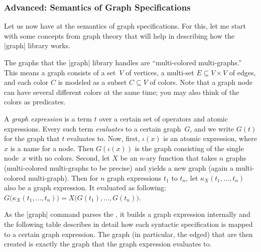 \subsubsection{Advanced: Semantics of Graph Specifications}

\label{section-library-graphs-semantics}

Let us now have at the semantics of graph specifications. For this,
let me start with some concepts from graph theory that will help in
describing how the |graph| library works. 

The graphs that the |graph| library handles are ``multi-colored
multi-graphs.'' This means a graph consists of a set~$V$ of vertices,
a multi-set $E \subseteq V \times V$ of edges, and each color $C$ is
modeled as a subset $C \subseteq V$ of colors. Note that a graph node
can have several different colors at the same time; you may also think
of the colors as predicates.

A \emph{graph expression} is a term $t$ over a certain set of
operators and atomic expressions. Every such term \emph{evaluates} to
a certain graph~$G$, and we write $G(t)$ for the graph that $t$
evaluates to. Now, first, $\iota(x)$ is an atomic expression, where
$x$ is a name for a node. Then $G(\iota(x))$ is the graph consisting
of the single node~$x$ with no colors. Second, let $X$ be an $n$-ary
function that takes $n$ graphs (multi-colored multi-graphs to be precise)
and yields a new graph (again a multi-colored multi-graph). Then for
$n$ graph expressions $t_1$ to $t_n$, let $\kappa_X(t_1,\dots,t_n)$ also be
a graph expression. It evaluated as following:
$G\bigl(\kappa_X(t_1,\dots,t_n)\bigr) = X\bigl(G(t_1),\dots, G(t_n)\bigr)$.

As the |graph| command parses the , it
builds a graph expression internally and the following table describes
in detail how each syntactic specification is mapped to a certain
graph expression. The graph (in particular, the edged) that are then
created is exactly the graph that the graph expression evaluates to.

